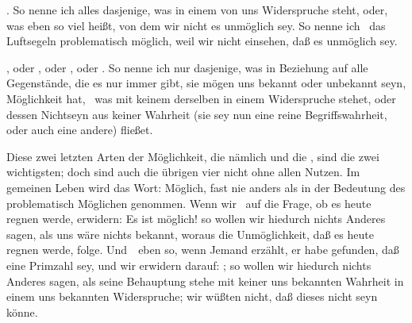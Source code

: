 \begin{aufza}
\begin{aufzb}
\item {}. So nenne ich alles dasjenige, was  in einem von uns  Widerspruche steht, oder, was eben so viel heißt, von dem wir nicht  es unmöglich sey. So nenne ich \zB\ das Luftsegeln problematisch möglich, weil wir nicht einsehen, daß es unmöglich sey.
\item {}, oder , oder , oder . So nenne ich nur dasjenige, was in Beziehung auf alle Gegenstände, die es nur immer gibt, sie mögen uns bekannt oder unbekannt seyn, Möglichkeit hat, \dh\ was mit keinem derselben in einem Widerspruche stehet, oder dessen Nichtseyn aus keiner Wahrheit (sie sey nun eine reine Begriffswahrheit, oder auch eine andere) fließet.
\end{aufzb}
\item Diese zwei letzten Arten der Möglichkeit, die  nämlich und die , sind die zwei wichtigsten; doch sind auch die übrigen vier nicht ohne allen Nutzen. Im gemeinen Leben wird das Wort: Möglich, fast nie anders als in der Bedeutung des problematisch Möglichen genommen. Wenn wir \zB\ auf die Frage, ob es heute regnen werde, erwidern: Es ist möglich! so wollen wir hiedurch nichts Anderes sagen, als uns wäre nichts bekannt, woraus die Unmöglichkeit, daß es heute regnen werde, folge. Und~\ eben so, wenn Jemand erzählt, er habe gefunden, daß  eine Primzahl sey, und wir erwidern darauf: ; so wollen wir hiedurch nichts Anderes sagen, als seine Behauptung stehe mit keiner uns bekannten Wahrheit in einem uns bekannten Widerspruche; wir wüßten nicht, daß dieses nicht seyn könne.
\begin{RWanm}

\end{RWanm}
\end{aufza}
